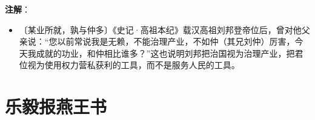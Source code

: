 \documentclass[12pt,UTF-8,openany]{ctexbook}
\begin{document}
\newpage

\textbf{注解}：

\vspace{-1em}

\begin{itemize}
    \setlength\itemsep{-0.2em}
    \item〔某业所就，孰与仲多〕《史记·高祖本纪》载汉高祖刘邦登帝位后，曾对他父亲说：“您以前常说我是无赖，不能治理产业，不如仲（其兄刘仲）厉害，今天我成就的功业，和仲相比谁多？”这也说明刘邦把治国视为治理产业，把君位视为使用权力营私获利的工具，而不是服务人民的工具。
\end{itemize}

\chapter{乐毅报燕王书}
\end{document}
